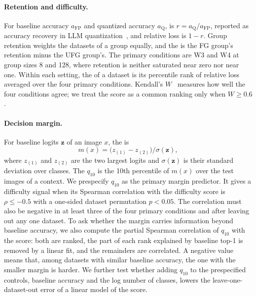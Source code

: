 \paragraph{Retention and difficulty.}
For baseline accuracy $a_{\mathrm{FP}}$ and quantized accuracy $a_{\mathrm{Q}}$,  is $r = a_{\mathrm{Q}} / a_{\mathrm{FP}}$, reported as accuracy recovery in LLM quantization~\cite{kurtic2025bf16}, and relative loss is $1-r$.
Group retention weights the datasets of a group equally, and the  is the FG group's retention minus the UFG group's.
The primary conditions are W3 and W4 at group sizes 8 and 128, where retention is neither saturated near zero nor near one.
Within each setting, the  of a dataset is its percentile rank of relative loss averaged over the four primary conditions.
Kendall's $W$~\cite{kendall1939problem} measures how well the four conditions agree; we treat the score as a common ranking only when $W \ge 0.6$.

\paragraph{Decision margin.}
For baseline logits $\bm{z}$ of an image $x$, the  is
\begin{equation}
  m(x) = \bigl(z_{(1)} - z_{(2)}\bigr) / \sigma(\bm{z}),
  \label{eq:margin}
\end{equation}
where $z_{(1)}$ and $z_{(2)}$ are the two largest logits and $\sigma(\bm{z})$ is their standard deviation over classes.
The  $q_{10}$ is the 10th percentile of $m(x)$ over the test images of a context.
We prespecify $q_{10}$ as the primary margin predictor.
It gives a difficulty signal when its Spearman correlation with the difficulty score is $\rho \le -0.5$ with a one-sided dataset permutation $p < 0.05$.
The correlation must also be negative in at least three of the four primary conditions and after leaving out any one dataset.
To ask whether the margin carries information beyond baseline accuracy, we also compute the partial Spearman correlation of $q_{10}$ with the score: both are ranked, the part of each rank explained by baseline top-1 is removed by a linear fit, and the remainders are correlated.
A negative value means that, among datasets with similar baseline accuracy, the one with the smaller margin is harder.
We further test whether adding $q_{10}$ to the prespecified controls, baseline accuracy and the log number of classes, lowers the leave-one-dataset-out error of a linear model of the score.

